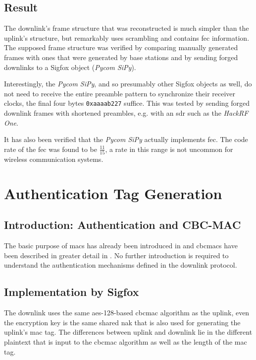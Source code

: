 \subsection{Result}
The downlink's frame structure that was reconstructed is much simpler than the uplink's structure, but remarkably uses scrambling and contains \gls{fec} information.
The supposed frame structure was verified by comparing manually generated frames with ones that were generated by base stations and by sending forged downlinks to a Sigfox object (\textit{Pycom SiPy}).

Interestingly, the \textit{Pycom SiPy}, and so presumably other Sigfox objects as well, do not need to receive the entire preamble pattern to synchronize their receiver clocks, the final four bytes \texttt{0xaaaab227} suffice.
This was tested by sending forged downlink frames with shortened preambles, e.g. with an \gls{sdr} such as the \textit{HackRF One}.

It has also been verified that the \textit{Pycom SiPy} actually implements \gls{fec}. The code rate of the \gls{fec} was found to be $\frac{11}{15}$, a rate in this range is not uncommon for wireless communication systems.

\FloatBarrier
\section{Authentication Tag Generation}
\label{sec:downlink_mac}
\subsection{Introduction: Authentication and CBC-MAC}
The basic purpose of \glspl{mac} has already been introduced in  and \glspl{cbcmac} have been described in greater detail in .
No further introduction is required to understand the authentication mechanisms defined in the downlink protocol.

\subsection{Implementation by Sigfox}
The downlink uses the same \gls{aes}-128-based \gls{cbcmac} algorithm as the uplink, even the encryption key is the same shared \gls{nak} that is also used for generating the uplink's \gls{mac} tag.
The differences between uplink and downlink lie in the different plaintext that is input to the \gls{cbcmac} algorithm as well as the length of the \gls{mac} tag.

